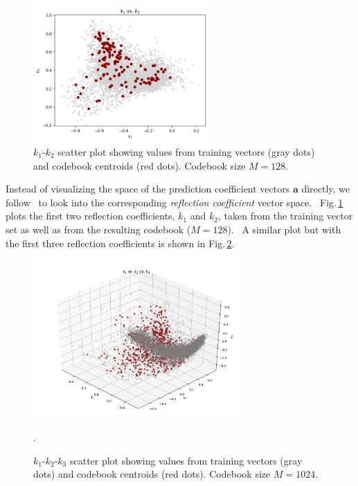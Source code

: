 \documentclass[letterpaper,12pt]{article}
\newcommand{\ba}{\ensuremath{\mathbf{a}}}
\begin{document}
    \begin{figure}[!ht]
        \centering
        \includegraphics[width=0.6\textwidth]{../HBSe_20170128T231621/cb_kk_training_8000_codebook_128.png}
        \caption{
        $k_1$-$k_2$ scatter plot showing values from training vectors (gray dots) and
        codebook centroids (red dots).
        Codebook size $M=128$.
        }
        \label{fig:cb_kk_training_8000_codebook_128}
    \end{figure}

    Instead of visualizing the space of the prediction coefficient vectors $\ba$
    directly, we follow~\citep{Juang-etal:82} to look into the
    corresponding \textit{reflection coefficient} vector space.
    \
    Fig.\,\ref{fig:cb_kk_training_8000_codebook_128}
    plots the first two reflection coefficients, $k_1$ and $k_2$,
    taken from the training vector set as well as from the resulting codebook ($M=128$).
    \
    A similar plot but with the first three reflection coefficients is shown
    in Fig.\,\ref{fig:cb_kkk_training_8000_codebook_1024}.
    \begin{figure}[!ht]
        \centering
        \includegraphics[width=0.7\textwidth]{../MARS_20161221_000046_SongSession_16kHz_HPF5Hz/cb_kkk_training_8000_codebook_1024.png}
        \caption{
        $k_1$-$k_2$-$k_3$ scatter plot showing values from training vectors (gray dots) and
        codebook centroids (red dots).
        Codebook size $M=1024$.
        }
        \label{fig:cb_kkk_training_8000_codebook_1024}.
    \end{figure}
\end{document}
